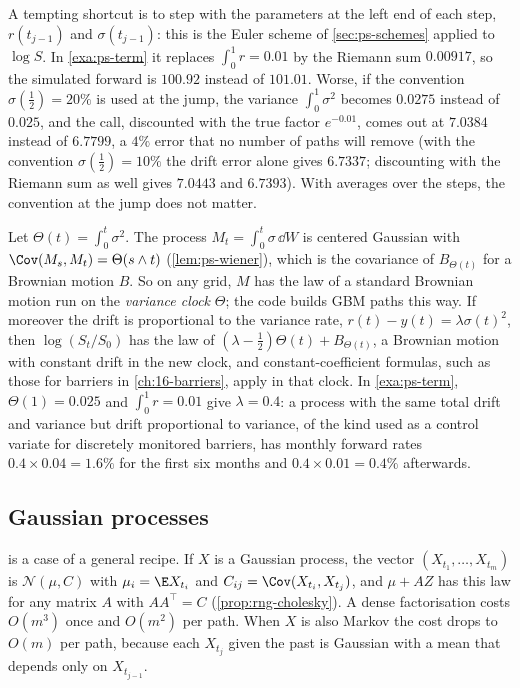 \begin{remark}\label{rem:ps-frozen}
A tempting shortcut is to step with the parameters at the left end of each step,
$r(t_{j-1})$ and $\sigma(t_{j-1})$: this is the Euler scheme of \cref{sec:ps-schemes}
applied to $\log S$. In \cref{exa:ps-term} it replaces $\int_0^1r=0.01$ by the Riemann sum
$0.00917$, so the simulated forward is $100.92$ instead of $101.01$. Worse, if the
convention $\sigma(\frac12)=20\%$ is used at the jump, the variance $\int_0^1\sigma^2$
becomes $0.0275$ instead of $0.025$, and the call, discounted with the true factor
$e^{-0.01}$, comes out at $7.0384$ instead of $6.7799$, a $4\%$ error that no number of paths
will remove (with the convention $\sigma(\frac12)=10\%$ the drift error alone gives
$6.7337$; discounting with the Riemann sum as well gives $7.0443$ and $6.7393$). With averages
over the steps, the convention at the jump does not matter.
\end{remark}

\begin{remark}\label{rem:ps-time-change}
Let $\Theta(t)=\int_0^t\sigma^2$. The process $M_t=\int_0^t\sigma\,\dd W$ is centered
Gaussian with $\Cov(M_s,M_t)=\Theta(s\wedge t)$ (\cref{lem:ps-wiener}), which is the
covariance of $B_{\Theta(t)}$ for a Brownian motion $B$. So on any grid, $M$ has the law of
a standard Brownian motion run on the \emph{variance clock} $\Theta$; the code builds GBM
paths this way. If moreover the drift is proportional to the variance rate,
$r(t)-y(t)=\lambda\sigma(t)^2$, then $\log(S_t/S_0)$ has the law of
$(\lambda-\frac12)\Theta(t)+B_{\Theta(t)}$, a Brownian motion with constant drift in the
new clock, and constant-coefficient formulas, such as those for barriers in
\cref{ch:16-barriers}, apply in that clock. In \cref{exa:ps-term}, $\Theta(1)=0.025$ and
$\int_0^1r=0.01$ give $\lambda=0.4$: a process with the same total drift and
variance but drift proportional to variance, of the kind used as a control variate for
discretely monitored barriers, has monthly forward rates $0.4\times0.04=1.6\%$ for the first
six months and $0.4\times0.01=0.4\%$ afterwards.
\end{remark}

\subsection{Gaussian processes}

 is a case of a general recipe. If $X$ is a Gaussian process, the
vector $(X_{t_1},\dots,X_{t_m})$ is $\mathcal N(\mu,C)$ with $\mu_i=\E X_{t_i}$ and
$C_{ij}=\Cov(X_{t_i},X_{t_j})$, and $\mu+AZ$ has this law for any matrix $A$ with
$AA^\top=C$ (\cref{prop:rng-cholesky}). A dense factorisation costs $O(m^3)$ once and
$O(m^2)$ per path. When $X$ is also Markov the cost drops to $O(m)$ per path, because
each $X_{t_j}$ given the past is Gaussian with a mean that depends only on $X_{t_{j-1}}$.

